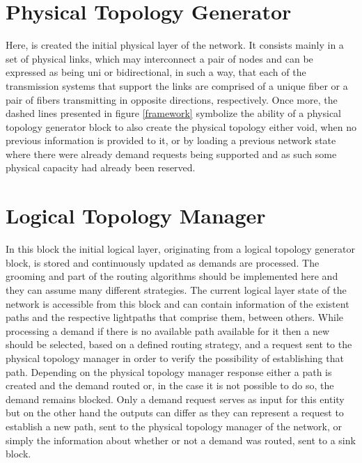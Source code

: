 \section{Physical Topology Generator}
\label{physicalTopologyGenerator}

Here, is created the initial physical layer of the network. It consists mainly in a set of physical links, which may interconnect a pair of nodes and can be expressed as being uni or bidirectional, in such a way, that each of the transmission systems that support the links are comprised of a unique fiber or a pair of fibers transmitting in opposite directions, respectively. Once more, the dashed lines presented in figure \ref{framework} symbolize the ability of a physical topology generator block to also create the physical topology either void, when no previous information is provided to it, or by loading a previous network state where there were already demand requests being supported and as such some physical capacity had already been reserved.

\section{Logical Topology Manager}
\label{logicalTopologyManager2}

In this block the initial logical layer, originating from a logical topology generator block, is stored and continuously updated as demands are processed. The grooming and part of the routing algorithms should be implemented here and they can assume many different strategies. The current logical layer state of the network is accessible from this block and can contain information of the existent paths and the respective lightpaths that comprise them, between others. While processing a demand if there is no available path available for it then a new should be selected, based on a defined routing strategy, and a request sent to the physical topology manager in order to verify the possibility of establishing that path. Depending on the physical topology manager response either a path is created and the demand routed or, in the case it is not possible to do so, the demand remains blocked.  Only a demand request serves as input for this entity but on the other hand the outputs can differ as they can represent a request to establish a new path, sent to the physical topology manager of the network, or simply the information about whether or not a demand was routed, sent to a sink block. 

